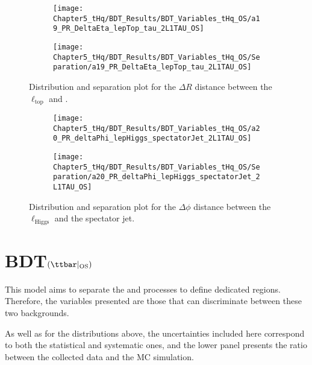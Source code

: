\begin{figure}[h]
\centering
\begin{subfigure}{.45\textwidth}
  \centering
  \texttt{[image: Chapter5\_tHq/BDT\_Results/BDT\_Variables\_tHq\_OS/a19\_PR\_DeltaEta\_lepTop\_tau\_2L1TAU\_OS]}
\end{subfigure}%
\begin{subfigure}{.55\textwidth}
  \centering
  \texttt{[image: Chapter5\_tHq/BDT\_Results/BDT\_Variables\_tHq\_OS/Separation/a19\_PR\_DeltaEta\_lepTop\_tau\_2L1TAU\_OS]}
\end{subfigure}
\caption{Distribution and separation plot for the $\Delta R$ distance between the $\ell_{\text{top}}$ and \tauhad.}
\label{fig:Appendix:BDTVARS:tHqOS:a19_PR_DeltaEta_lepTop_tau}
\end{figure}

\begin{figure}[h]
\centering
\begin{subfigure}{.45\textwidth}
  \centering
  \texttt{[image: Chapter5\_tHq/BDT\_Results/BDT\_Variables\_tHq\_OS/a20\_PR\_deltaPhi\_lepHiggs\_spectatorJet\_2L1TAU\_OS]}
\end{subfigure}%
\begin{subfigure}{.55\textwidth}
  \centering
  \texttt{[image: Chapter5\_tHq/BDT\_Results/BDT\_Variables\_tHq\_OS/Separation/a20\_PR\_deltaPhi\_lepHiggs\_spectatorJet\_2L1TAU\_OS]}
\end{subfigure}
\caption{Distribution and separation plot for the $\Delta \phi$ distance between the $\ell_{\text{Higgs}}$ and
the spectator jet.}
\label{fig:Appendix:BDTVARS:tHqOS:a20_PR_deltaPhi_lepHiggs_spectatorJet}
\end{figure}

\FloatBarrier


\section{BDT$(\ttbar|_{\text{OS}})$}
\label{chap:Appendix:BDT_Variables:OS_ttbar}
This model aims to separate the \ttbar and \Zjets processes to 
define dedicated regions. Therefore, the variables presented are those that
can discriminate between these two backgrounds.


As well as for the distributions above, the uncertainties included here correspond
to both the statistical and systematic ones, and the lower panel presents the ratio 
between the collected data and the MC simulation. 

